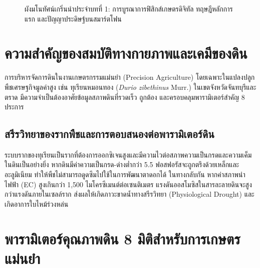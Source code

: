 \begin{figure}[H]
\caption{ผังมโนทัศน์เกริ่นนำประจำบทที่ 1: การบูรณาการฟิสิกส์เกษตรดิจิทัล ทฤษฎีหลักการแรก และปัญญาประดิษฐ์บนสมาร์ตโฟน}
\label{fig:ch01_concept_overview}
\end{figure}

\section{ความสำคัญของสมบัติทางกายภาพและเคมีของดิน}

การบริหารจัดการดินในงานเกษตรกรรมแม่นยำ (Precision Agriculture) โดยเฉพาะในแปลงปลูกพืชเศรษฐกิจมูลค่าสูง เช่น ทุเรียนหมอนทอง (\textit{Durio zibethinus} Murr.) ในเขตจังหวัดจันทบุรีและตราด มีความจำเป็นต้องอาศัยข้อมูลสภาพดินที่รวดเร็ว ถูกต้อง และครอบคลุมพารามิเตอร์สำคัญ 8 ประการ

\subsection{สรีรวิทยาของรากพืชและการตอบสนองต่อพารามิเตอร์ดิน}
ระบบรากของทุเรียนเป็นรากที่ต้องการออกซิเจนสูงและมีความไวต่อสภาพความเป็นกรดและความเค็มในดินเป็นอย่างยิ่ง หากดินมีค่าความเป็นกรด-ด่างต่ำกว่า 5.5 ฟอสฟอรัสจะถูกตรึงด้วยเหล็กและอะลูมิเนียม ทำให้พืชไม่สามารถดูดซึมไปใช้ในการพัฒนาตาดอกได้ ในทางกลับกัน หากค่าสภาพนำไฟฟ้า (EC) สูงเกินกว่า 1,500 ไมโครซีเมนต์ต่อเซนติเมตร แรงดันออสโมซิสในสารละลายดินจะสูงกว่าแรงดันภายในเซลล์ราก ส่งผลให้เกิดภาวะขาดน้ำทางสรีรวิทยา (Physiological Drought) และเกิดอาการใบไหม้ร่วงหล่น

\section{พารามิเตอร์คุณภาพดิน 8 มิติสำหรับการเกษตรแม่นยำ}


